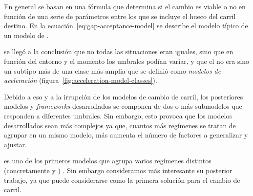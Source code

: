 En general se basan en una fórmula que determina si el cambio es viable o no en función de una serie de parámetros entre los que se incluye el hueco del carril destino. En la ecuación~\ref{eq:gap-acceptance-model} se describe el modelo típico de un modelo de \textit{}. 


 se llegó a la conclusión que no todas las situaciones eran iguales, sino que en función del entorno y el momento los umbrales podían variar, y que el \textit{} no era sino un subtipo más de una clase más amplia que se definió como \textit{modelos de aceleración} (figura~\ref{fig:acceleration-model-classes}).

Debido a eso y a la irrupción de los modelos de cambio de carril, los posteriores modelos y \textit{frameworks} desarrollados se componen de dos o más submodelos que responden a diferentes umbrales. Sin embargo, esto provoca que los modelos desarrollados sean más complejos ya que, cuantos más regímenes se tratan de agrupar en un mismo modelo, más aumenta el número de factores a generalizar y ajustar.

 es uno de los primeros modelos que agrupa varios regímenes distintos (concretamente \textit{} y \textit{}) \cite{Gipps1981}. Sin embargo consideramos más interesante su posterior trabajo, \cite{Gipps1986} ya que puede considerarse como la primera solución para el cambio de carril.


